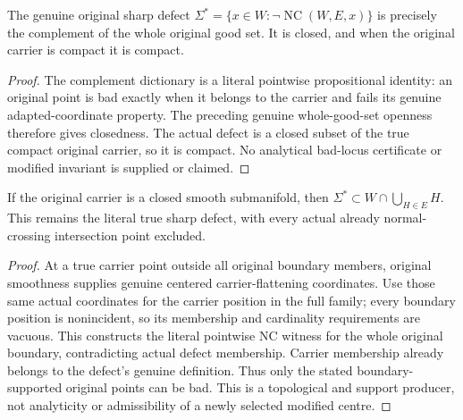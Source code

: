 \begin{theorem}
\label{hir:sharp-original-multiboundary-closed-compact-defect}
\leanok
The genuine original sharp defect
$\Sigma^* =\{x\in W:\neg\operatorname{NC}(W,E,x)\}$
is precisely the complement of the whole original good set. It is
closed, and when the original carrier is compact it is compact.
\end{theorem}
\begin{proof}
The complement dictionary is a literal pointwise propositional identity:
an original point is bad exactly when it belongs to the carrier and
fails its genuine adapted-coordinate property. The preceding genuine
whole-good-set openness therefore gives closedness. The actual defect
is a closed subset of the true compact original carrier, so it is
compact. No analytical bad-locus certificate or modified invariant is
supplied or claimed.
\end{proof}

\begin{lemma}
\label{hir:sharp-original-multiboundary-defect-boundary-support}
\leanok
If the original carrier is a closed smooth submanifold, then
$\Sigma^*\subset W\cap\bigcup_{H\in E}H$. This remains the literal true
sharp defect, with every actual already normal-crossing intersection
point excluded.
\end{lemma}
\begin{proof}
At a true carrier point outside all original boundary members, original
smoothness supplies genuine centered carrier-flattening coordinates.
Use those same actual coordinates for the carrier position in the full
family; every boundary position is nonincident, so its membership and
cardinality requirements are vacuous. This constructs the literal
pointwise NC witness for the whole original boundary, contradicting
actual defect membership. Carrier membership already belongs to the
defect's genuine definition. Thus only the stated boundary-supported
original points can be bad. This is a topological and support producer,
not analyticity or admissibility of a newly selected modified centre.
\end{proof}
